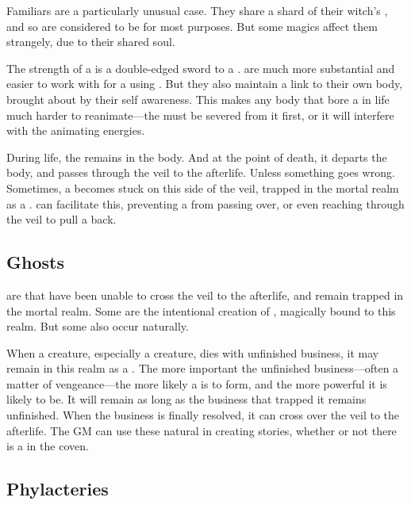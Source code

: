 Familiars are a particularly unusual case.
They share a shard of their witch's {\soul}, and so are considered to be {\strongsouled} for most purposes.
But some magics affect them strangely, due to their shared soul.

The strength of a {\soul} is a double-edged sword to a .
\capital{\strongsouls} are much more substantial and easier to work with for a  using {\ghosts}.
But they also maintain a link to their own body, brought about by their self awareness.
This makes any body that bore a {\strongsoul} in life much harder to reanimate---the {\soul} must be severed from it first, or it will interfere with the animating energies.

During life, the {\soul} remains in the body.
And at the point of death, it departs the body, and passes through the veil to the afterlife.
Unless something goes wrong.
Sometimes, a {\soul} becomes stuck on this side of the veil, trapped in the mortal realm as a {\ghost}.
 can facilitate this, preventing a {\soul} from passing over, or even reaching through the veil to pull a {\soul} back.

\subsection{Ghosts}

\capital{\ghosts} are {\souls} that have been unable to cross the veil to the afterlife, and remain trapped in the mortal realm.
Some are the intentional creation of , magically bound to this realm.
But some also occur naturally.

When a creature, especially a {\strongsouled} creature, dies with unfinished business, it may remain in this realm as a {\ghost}.
The more important the unfinished business---often a matter of vengeance---the more likely a {\ghost} is to form, and the more powerful it is likely to be.
It will remain as long as the business that trapped it remains unfinished.
When the business is finally resolved, it can cross over the veil to the afterlife.
The GM can use these natural {\ghosts} in creating stories, whether or not there is a  in the coven.

\subsection{Phylacteries}

